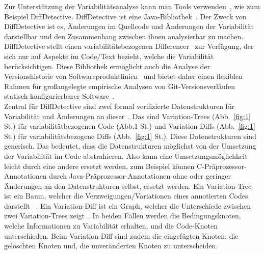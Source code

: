 Zur Unterstützung der Variabilitätsanalyse kann man Tools verwenden~\cite{SSK+:VaMoS20,10.1145/2660190.2662113}, wie zum Beispiel DiffDetective. DiffDetective ist eine Java-Bibliothek~\cite{BSM+:FSE24}. Der Zweck von DiffDetective ist es, Änderungen im Quellcode und Änderungen der Variabilität darstellbar und den Zusammenhang zwischen ihnen analysierbar zu machen. DiffDetective stellt einen variabilitätsbezogenen Differencer~\cite{BSM+:FSE24,BTS+:ESECFSE22} zur Verfügung, der sich nur auf Aspekte im Code/Text bezieht, welche die Variabilität berücksichtigen. Diese Bibliothek ermöglicht auch die Analyse der Versionshistorie von Softwareproduktlinien~\cite{BTS+:ESECFSE22} und bietet daher einen flexiblen Rahmen für großangelegte empirische Analysen von Git-Versionsverläufen statisch konfigurierbarer Software~\cite{BSM+:FSE24,BSG+:SPLC23}.\\

Zentral für DiffDetective sind zwei formal verifizierte Datenstrukturen für Variabilität und Änderungen an dieser~\cite{BTS+:ESECFSE22}. Das sind Variation-Trees (Abb.~\ref{fig:1} St.) für variabilitätbezogenen Code (Abb.1 St.) und Variation-Diffs (Abb.~\ref{fig:1} St.) für variabilitätsbezogene Diffs (Abb.~\ref{fig:1} St.). Diese Datenstrukturen sind generisch. Das bedeutet, dass die Datenstrukturen möglichst von der Umsetzung der Variabilität im Code abstrahieren. Also kann eine Umsetzungsmöglichkeit leicht durch eine andere ersetzt werden, zum Beispiel können C-Präprozessor-Annotationen  durch Java-Präprozessor-Annotationen ohne oder geringer Änderungen an den Datenstrukturen selbst, ersetzt werden. Ein Variation-Tree ist ein Baum, welcher die Verzweigungen/Variationen eines annotierten Codes darstellt ~\cite{BSM+:FSE24,BTS+:ESECFSE22,BSG+:SPLC23}. Ein Variation-Diff ist ein Graph, welcher die Unterschiede zwischen zwei Variation-Trees zeigt~\cite{BSM+:FSE24,BTS+:ESECFSE22,BSG+:SPLC23}. In beiden Fällen werden die Bedingungsknoten, welche Informationen zu Variabilität erhalten, und die Code-Knoten unterschieden. Beim Variation-Diff sind zudem die eingefügten Knoten, die gelöschten Knoten und, die unveränderten Knoten zu unterscheiden.\\



